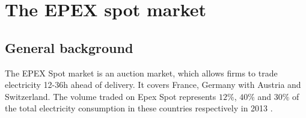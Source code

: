 

%
%
%
%



\section{The EPEX spot market}
\label{epexall}
\subsection{General background}
\label{epexbackground}
The EPEX Spot market is an auction market, which allows firms to trade electricity 12-36h ahead of delivery. It covers France, Germany with Austria and Switzerland. The volume traded on Epex Spot represents $12\%$, $40\%$ and $30\%$ of the total electricity consumption in these countries respectively in 2013 \cite{epexwebsite1}.\\


